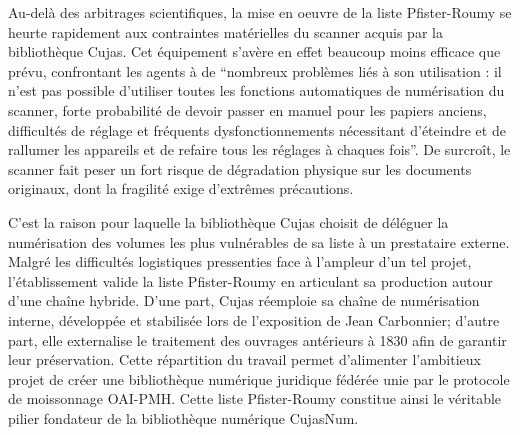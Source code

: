Au-delà des arbitrages scientifiques, la mise en oeuvre de la liste Pfister-Roumy se heurte rapidement aux contraintes matérielles du scanner acquis par la bibliothèque Cujas. Cet équipement s'avère en effet beaucoup moins efficace que prévu, confrontant les agents à de \enquote{nombreux problèmes liés à son utilisation : il n'est pas possible d'utiliser toutes les fonctions automatiques de numérisation du scanner, forte probabilité de devoir passer en manuel pour les papiers anciens, difficultés de réglage et fréquents dysfonctionnements nécessitant d'éteindre et de rallumer les appareils et de refaire tous les réglages à chaques fois}. De surcroît, le scanner fait peser un fort risque de dégradation physique sur les documents originaux, dont la fragilité exige d'extrêmes précautions. 

C'est la raison pour laquelle la bibliothèque Cujas choisit de déléguer la numérisation des volumes les plus vulnérables de sa liste à un prestataire externe. Malgré les difficultés logistiques pressenties face à l'ampleur d'un tel projet, l'établissement valide la liste Pfister-Roumy en articulant sa production autour d'une chaîne hybride. D'une part, Cujas réemploie sa chaîne de numérisation interne, développée et stabilisée lors de l'exposition de Jean Carbonnier; d'autre part, elle externalise le traitement des ouvrages antérieurs à 1830 afin de garantir leur préservation. Cette répartition du travail permet d'alimenter l'ambitieux projet de créer une bibliothèque numérique juridique fédérée unie par le protocole de moissonnage OAI-PMH. Cette liste Pfister-Roumy constitue ainsi le véritable pilier fondateur de la bibliothèque numérique CujasNum.